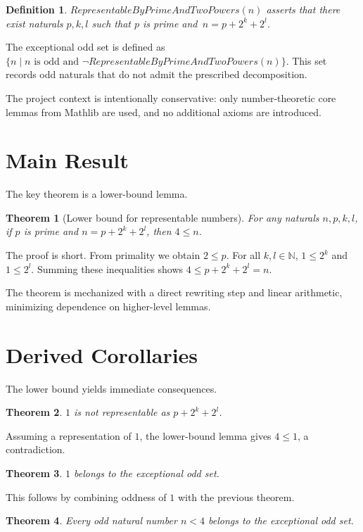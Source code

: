 \documentclass[11pt]{article}
\newtheorem{theorem}{Theorem}
\newtheorem{definition}{Definition}
\begin{document}
\begin{definition}
$RepresentableByPrimeAndTwoPowers(n)$ asserts that
there exist naturals $p,k,l$ such that $p$ is prime and
$\,n=p+2^k+2^l$.
\end{definition}

The exceptional odd set is defined as
$\{n \mid n \text{ is odd and } \neg RepresentableByPrimeAndTwoPowers(n)\}$.
This set records odd naturals that do not admit the prescribed decomposition.

The project context is intentionally conservative: only number-theoretic core
lemmas from Mathlib are used, and no additional axioms are introduced.

\section{Main Result}
The key theorem is a lower-bound lemma.

\begin{theorem}[Lower bound for representable numbers]
For any naturals $n,p,k,l$, if $p$ is prime and $n=p+2^k+2^l$, then
$4\le n$.
\end{theorem}

The proof is short. From primality we obtain $2\le p$. For all $k,l\in\mathbb{N}$,
$1\le 2^k$ and $1\le 2^l$. Summing these inequalities shows
$4\le p+2^k+2^l=n$.

The theorem is mechanized with a direct rewriting step and linear arithmetic,
minimizing dependence on higher-level lemmas.

\section{Derived Corollaries}
The lower bound yields immediate consequences.

\begin{theorem}
$1$ is not representable as $p+2^k+2^l$.
\end{theorem}

Assuming a representation of $1$, the lower-bound lemma gives $4\le1$, a
contradiction.

\begin{theorem}
$1$ belongs to the exceptional odd set.
\end{theorem}

This follows by combining oddness of $1$ with the previous theorem.

\begin{theorem}
Every odd natural number $n<4$ belongs to the exceptional odd set.
\end{theorem}
\end{document}
